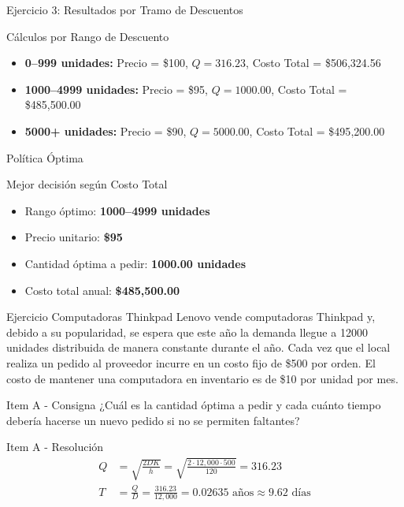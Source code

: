 \documentclass{beamer}
\begin{document}
\begin{frame}{Ejercicio 3: Resultados por Tramo de Descuentos}
    \begin{block}{Cálculos por Rango de Descuento}
        \begin{itemize}
            \item \textbf{0--999 unidades:} Precio = \$100, \quad $Q = 316.23$, \quad Costo Total = \$506{,}324.56
            \item \textbf{1000--4999 unidades:} Precio = \$95, \quad $Q = 1000.00$, \quad Costo Total = \$485{,}500.00
            \item \textbf{5000+ unidades:} Precio = \$90, \quad $Q = 5000.00$, \quad Costo Total = \$495{,}200.00
        \end{itemize}
    \end{block}
\end{frame}

\begin{frame}{Política Óptima}
    \begin{block}{Mejor decisión según Costo Total}
        \begin{itemize}
            \item Rango óptimo: \textbf{1000--4999 unidades}
            \item Precio unitario: \textbf{\$95}
            \item Cantidad óptima a pedir: \textbf{1000.00 unidades}
            \item Costo total anual: \textbf{\$485{,}500.00}
        \end{itemize}
    \end{block}
\end{frame}

\begin{frame}{Ejercicio Computadoras Thinkpad}
    Lenovo vende computadoras Thinkpad y, debido a su popularidad, se espera que este año la demanda llegue a 12000 unidades distribuida de manera constante durante el año. Cada vez que el local realiza un pedido al proveedor incurre en un costo fijo de \$500 por orden. El costo de mantener una computadora en inventario es de \$10 por unidad por mes.
\end{frame}

\begin{frame}{Item A - Consigna}
    ¿Cuál es la cantidad óptima a pedir y cada cuánto tiempo debería hacerse un nuevo pedido si no se permiten faltantes?
\end{frame}

\begin{frame}{Item A - Resolución}
\begin{align*}
Q &= \sqrt{\frac{2DK}{h}} = \sqrt{\frac{2 \cdot 12{,}000 \cdot 500}{120}} = 316.23 \\[2em]
T &= \frac{Q}{D} = \frac{316.23}{12{,}000} = 0.02635 \text{ años} \approx 9.62 \text{ días}
\end{align*}
\end{frame}
\end{document}
